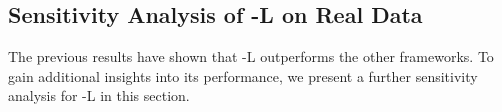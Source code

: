 \subsection{Sensitivity Analysis of \MSWave-L{} on Real Data}

The previous results have shown that \MSWave-L{} outperforms the other
frameworks.  To gain additional insights into its performance, we present
a further sensitivity analysis for \MSWave-L{} in this section.

\begin{figure}[tb]
\centering
{}
\hspace{0.1cm}
\end{figure}
